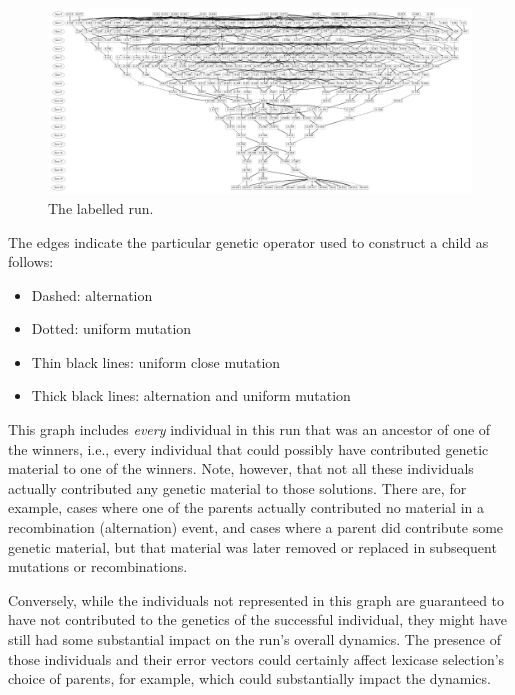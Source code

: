 \begin{figure} %
	\begin{center}
		\vspace{0.6\columnwidth}
		\includegraphics[width=\columnwidth]{../figures/run0_GPTP_2_font_30}
	\end{center}
	\caption{The labelled run.}
	\label{fig:run0Labelled}       %
\end{figure}

The edges indicate the particular genetic operator used to construct a child
as follows:
\begin{itemize}
	\item Dashed: alternation
	\item Dotted: uniform mutation
	\item Thin black lines: uniform close mutation
	\item Thick black lines: alternation and uniform mutation
\end{itemize}

This graph includes \emph{every} individual in this run that was an 
ancestor of one of the winners, i.e., every individual that could possibly have 
contributed genetic material to one of the winners. Note, however, that not
all these individuals actually contributed any genetic material to those
solutions. There are, for example, cases where one of the parents actually
contributed no material in a recombination (alternation) event, and cases where
a parent did contribute some genetic material, but that material was later
removed or replaced in subsequent mutations or recombinations. 

Conversely, while the individuals not represented in this graph are
guaranteed to have not contributed to the genetics of the successful
individual, they might have still had some substantial impact on the
run's overall dynamics. The presence of those individuals and their
error vectors could certainly affect lexicase selection's choice of parents,
for example, which could substantially impact the dynamics.

